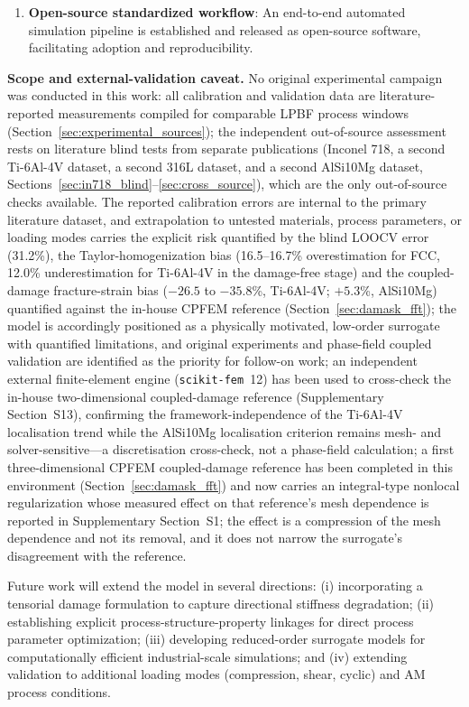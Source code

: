 \begin{enumerate}
    \item \textbf{Open-source standardized workflow}: An end-to-end automated simulation pipeline is established and released as open-source software, facilitating adoption and reproducibility.
\end{enumerate}

\textbf{Scope and external-validation caveat.} No original experimental campaign was conducted in this work: all calibration and validation data are literature-reported measurements compiled for comparable LPBF process windows (Section~\ref{sec:experimental_sources}); the independent out-of-source assessment rests on literature blind tests from separate publications (Inconel 718, a second Ti-6Al-4V dataset, a second 316L dataset, and a second AlSi10Mg dataset, Sections~\ref{sec:in718_blind}--\ref{sec:cross_source}), which are the only out-of-source checks available. The reported calibration errors are internal to the primary literature dataset, and extrapolation to untested materials, process parameters, or loading modes carries the explicit risk quantified by the blind LOOCV error (31.2\%), the Taylor-homogenization bias (16.5--16.7\% overestimation for FCC, 12.0\% underestimation for Ti-6Al-4V in the damage-free stage) and the coupled-damage fracture-strain bias ($-26.5$ to $-35.8$\%, Ti-6Al-4V; $+5.3$\%, AlSi10Mg) quantified against the in-house CPFEM reference (Section~\ref{sec:damask_fft}); the model is accordingly positioned as a physically motivated, low-order surrogate with quantified limitations, and original experiments and phase-field coupled validation are identified as the priority for follow-on work; an independent external finite-element engine (\texttt{scikit-fem}~12) has been used to cross-check the in-house two-dimensional coupled-damage reference (Supplementary Section~S13), confirming the framework-independence of the Ti-6Al-4V localisation trend while the AlSi10Mg localisation criterion remains mesh- and solver-sensitive---a discretisation cross-check, not a phase-field calculation; a first three-dimensional CPFEM coupled-damage reference has been completed in this environment (Section~\ref{sec:damask_fft}) and now carries an integral-type nonlocal regularization whose measured effect on that reference's mesh dependence is reported in Supplementary Section~S1; the effect is a compression of the mesh dependence and not its removal, and it does not narrow the surrogate's disagreement with the reference.

Future work will extend the model in several directions: (i) incorporating a tensorial damage formulation to capture directional stiffness degradation; (ii) establishing explicit process-structure-property linkages for direct process parameter optimization; (iii) developing reduced-order surrogate models for computationally efficient industrial-scale simulations; and (iv) extending validation to additional loading modes (compression, shear, cyclic) and AM process conditions.

